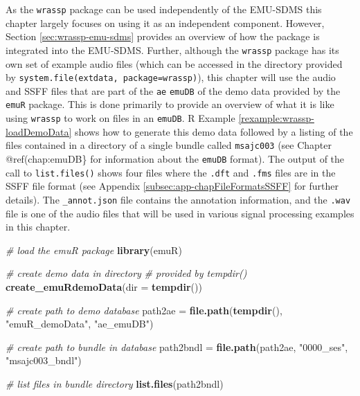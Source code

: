 \documentclass[]{book}
\newenvironment{Shaded}{\begin{snugshade}}{\end{snugshade}}
\newcommand{\CommentTok}[1]{\textcolor[rgb]{0.56,0.35,0.01}{\textit{#1}}}
\newcommand{\DataTypeTok}[1]{\textcolor[rgb]{0.13,0.29,0.53}{#1}}
\newcommand{\KeywordTok}[1]{\textcolor[rgb]{0.13,0.29,0.53}{\textbf{#1}}}
\newcommand{\NormalTok}[1]{#1}
\newcommand{\StringTok}[1]{\textcolor[rgb]{0.31,0.60,0.02}{#1}}
\theoremstyle{definition}
\theoremstyle{definition}
\theoremstyle{definition}
\theoremstyle{remark}
\begin{document}
As the \texttt{wrassp} package can be used independently of the EMU-SDMS
this chapter largely focuses on using it as an independent component.
However, Section \ref{sec:wrassp-emu-sdms} provides an overview of how
the package is integrated into the EMU-SDMS. Further, although the
\texttt{wrassp} package has its own set of example audio files (which
can be accessed in the directory provided by
\texttt{system.file(\textquotesingle{}extdata\textquotesingle{},\ package=\textquotesingle{}wrassp\textquotesingle{})}),
this chapter will use the audio and SSFF files that are part of the
\texttt{ae} \texttt{emuDB} of the demo data provided by the
\texttt{emuR} package. This is done primarily to provide an overview of
what it is like using \texttt{wrassp} to work on files in an
\texttt{emuDB}. R Example \ref{rexample:wrassp-loadDemoData} shows how
to generate this demo data followed by a listing of the files contained
in a directory of a single bundle called \texttt{msajc003} (see Chapter
@ref(chap:emuDB\} for information about the \texttt{emuDB} format). The
output of the call to \texttt{list.files()} shows four files where the
\texttt{.dft} and \texttt{.fms} files are in the SSFF file format (see
Appendix \ref{subsec:app-chapFileFormatsSSFF} for further details). The
\texttt{\_annot.json} file contains the annotation information, and the
\texttt{.wav} file is one of the audio files that will be used in
various signal processing examples in this chapter.

\begin{Shaded}
\begin{Highlighting}[]
\CommentTok{# load the emuR package}
\KeywordTok{library}\NormalTok{(emuR)}

\CommentTok{# create demo data in directory}
\CommentTok{# provided by tempdir()}
\KeywordTok{create_emuRdemoData}\NormalTok{(}\DataTypeTok{dir =} \KeywordTok{tempdir}\NormalTok{())}

\CommentTok{# create path to demo database}
\NormalTok{path2ae =}\StringTok{ }\KeywordTok{file.path}\NormalTok{(}\KeywordTok{tempdir}\NormalTok{(), }\StringTok{"emuR_demoData"}\NormalTok{, }\StringTok{"ae_emuDB"}\NormalTok{)}

\CommentTok{# create path to bundle in database}
\NormalTok{path2bndl =}\StringTok{ }\KeywordTok{file.path}\NormalTok{(path2ae, }\StringTok{"0000_ses"}\NormalTok{, }\StringTok{"msajc003_bndl"}\NormalTok{)}

\CommentTok{# list files in bundle directory}
\KeywordTok{list.files}\NormalTok{(path2bndl)}
\end{Highlighting}
\end{Shaded}
\end{document}
